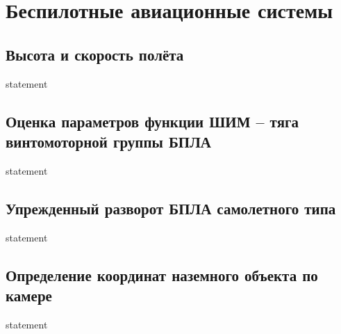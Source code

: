 \chapter{Беспилотные авиационные системы}

\section{Высота и скорость полёта}
{statement}

\section{Оценка параметров функции ШИМ -- тяга винтомоторной группы БПЛА}
{statement}

\section{Упрежденный разворот БПЛА самолетного типа}
{statement}

\section{Определение координат наземного объекта по камере}
{statement}